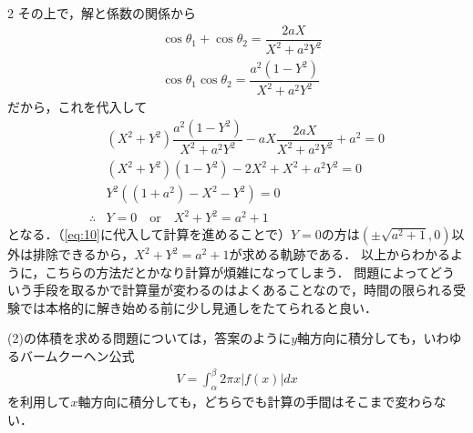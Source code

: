 \documentclass[../../main.tex]{subfiles}
\begin{document}
\begin{multicols}{2}
  その上で，解と係数の関係から
  \begin{align}
    & \cos\theta_1 + \cos\theta_2 = \dfrac{2aX}{X^2+a^2Y^2}                   \\
    & \cos\theta_1\cos\theta_2    = \dfrac{a^2\left(1-Y^2\right)}{X^2+a^2Y^2}
  \end{align}
  だから，これを代入して
  \begin{align}
    & \left(X^2+Y^2\right)\dfrac{a^2\left(1-Y^2\right)}{X^2+a^2Y^2} -aX\dfrac{2aX}{X^2+a^2Y^2} + a^2 = 0 \\
    & \left(X^2+Y^2\right)\left(1-Y^2\right) -2X^2 + X^2+a^2Y^2 = 0                                    \\
    & Y^2\left((1+a^2) - X^2-Y^2\right) = 0 \\
    \therefore
    & Y=0 \quad\text{or}\quad X^2+Y^2=a^2+1
  \end{align}
  となる．（\cref{eq:10}に代入して計算を進めることで）$Y=0$の方は$(\pm\sqrt{a^2+1},0)$以外は排除できるから，$X^2+Y^2=a^2+1$が求める軌跡である．
  以上からわかるように，こちらの方法だとかなり計算が煩雑になってしまう．
  問題によってどういう手段を取るかで計算量が変わるのはよくあることなので，時間の限られる受験では本格的に解き始める前に少し見通しをたてられると良い．

  (2)の体積を求める問題については，答案のように$y$軸方向に積分しても，いわゆるバームクーヘン公式
  \begin{align}
    V = \int_{\alpha}^{\beta} 2\pi x |f(x)| dx
  \end{align}
  を利用して$x$軸方向に積分しても，どちらでも計算の手間はそこまで変わらない．

  \begin{figure}[H]
    \centering
\end{figure}
\end{multicols}
\end{document}
